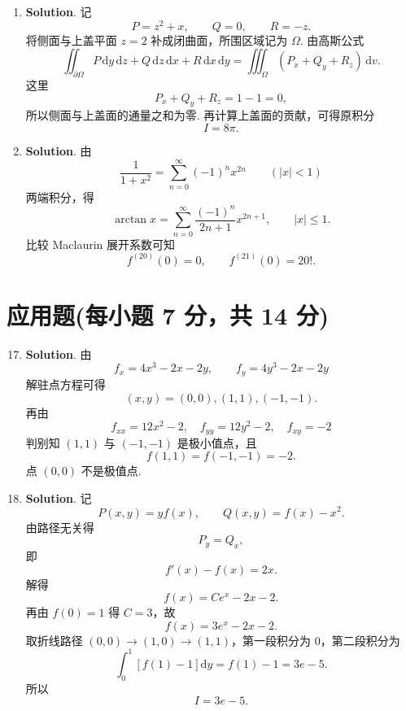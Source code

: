 \documentclass[../Main.tex]{subfiles}
\begin{document}
\begin{enumerate}
    \item \textbf{Solution}. 记
          \[
              P=z^2+x,\qquad Q=0,\qquad R=-z.
          \]
          将侧面与上盖平面 \(z=2\) 补成闭曲面，所围区域记为 \(\Omega\). 由高斯公式
          \[
              \iint_{\partial\Omega}P\,\mathrm{d}y\,\mathrm{d}z+Q\,\mathrm{d}z\,\mathrm{d}x+R\,\mathrm{d}x\,\mathrm{d}y
              =\iiint_\Omega(P_x+Q_y+R_z)\,\mathrm{d}v.
          \]
          这里
          \[
              P_x+Q_y+R_z=1-1=0,
          \]
          所以侧面与上盖面的通量之和为零. 再计算上盖面的贡献，可得原积分
          \[
              I=8\pi.
          \]

    \item \textbf{Solution}. 由
          \[
              \frac{1}{1+x^2}=\sum_{n=0}^{\infty}(-1)^n x^{2n}\qquad (|x|<1)
          \]
          两端积分，得
          \[
              \arctan x=\sum_{n=0}^{\infty}\frac{(-1)^n}{2n+1}x^{2n+1},\qquad |x|\le 1.
          \]
          比较 Maclaurin 展开系数可知
          \[
              f^{(20)}(0)=0,\qquad f^{(21)}(0)=20!.
          \]
\end{enumerate}

\section{应用题(每小题 7 分，共 14 分)}
\begin{enumerate}
    \setcounter{enumi}{16}
    \item \textbf{Solution}. 由
          \[
              f_x=4x^3-2x-2y,\qquad f_y=4y^3-2x-2y
          \]
          解驻点方程可得
          \[
              (x,y)=(0,0),(1,1),(-1,-1).
          \]
          再由
          \[
              f_{xx}=12x^2-2,\quad f_{yy}=12y^2-2,\quad f_{xy}=-2
          \]
          判别知 \((1,1)\) 与 \((-1,-1)\) 是极小值点，且
          \[
              f(1,1)=f(-1,-1)=-2.
          \]
          点 \((0,0)\) 不是极值点.

    \item \textbf{Solution}. 记
          \[
              P(x,y)=yf(x),\qquad Q(x,y)=f(x)-x^2.
          \]
          由路径无关得
          \[
              P_y=Q_x,
          \]
          即
          \[
              f'(x)-f(x)=2x.
          \]
          解得
          \[
              f(x)=Ce^x-2x-2.
          \]
          再由 \(f(0)=1\) 得 \(C=3\)，故
          \[
              f(x)=3e^x-2x-2.
          \]
          取折线路径 \((0,0)\to(1,0)\to(1,1)\)，第一段积分为 \(0\)，第二段积分为
          \[
              \int_0^1[f(1)-1]\mathrm{d}y=f(1)-1=3e-5.
          \]
          所以
          \[
              I=3e-5.
          \]
\end{enumerate}
\end{document}
